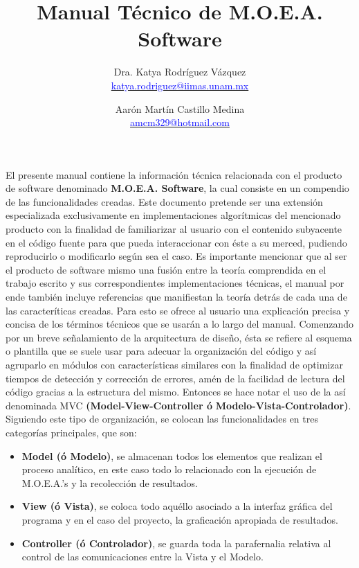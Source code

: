 \documentclass[12pt,twoside]{article}
\title{\vspace{+0.62cm}\textbf{Manual Técnico de M.O.E.A. Software}}
\author{Dra. Katya Rodríguez Vázquez \\ \href{mailto:katya.rodriguez@iimas.unam.mx}{\textcolor{blue}{katya.rodriguez@iimas.unam.mx}} 
   \and Aarón Martín Castillo Medina \\ \href{mailto:amcm329@hotmail.com}{\textcolor{blue}{amcm329@hotmail.com}}}
\date{}
\begin{document}
\maketitle

\vspace{-0.5cm}
El presente manual contiene la información técnica relacionada con el 
producto de software denominado \textbf{M.O.E.A. Software}, la cual consiste 
en un compendio de las funcionalidades creadas.\break
Este documento pretende ser una extensión especializada exclusivamente 
en implementaciones algorítmicas del mencionado producto con la finalidad 
de familiarizar al usuario con el contenido subyacente en el código fuente 
para que pueda interaccionar con éste a su merced, pudiendo reproducirlo o 
modificarlo según sea el caso.\medskip\break
Es importante mencionar que al ser el producto de software mismo una fusión 
entre la teoría comprendida en el trabajo escrito y sus correspondientes 
implementaciones técnicas, el manual por ende también incluye referencias 
que manifiestan la teoría detrás de cada una de las caracteríticas creadas.\break
Para esto se ofrece al usuario una explicación precisa y concisa de los términos
técnicos que se usarán a lo largo del manual.\medskip\break
Comenzando por un breve señalamiento de la arquitectura de diseño, ésta se refiere 
al esquema o plantilla que se suele usar para adecuar la organización del código 
y así agruparlo en módulos con características similares con la finalidad de 
optimizar tiempos de detección y corrección de errores, amén de la facilidad de 
lectura del código gracias a la estructura del mismo.\break
Entonces se hace notar el uso de la así denominada MVC \textbf{(Model-View-Controller 
ó }\break\textbf{Modelo-Vista-Controlador)}.\break
Siguiendo este tipo de organización, se colocan las funcionalidades en tres categorías 
principales, que son:

\begin{itemize}
\item \textbf{Model (ó Modelo)}, se almacenan todos los elementos que realizan 
el proceso analítico, en este caso todo lo relacionado con la ejecución de M.O.E.A.’s 
y la recolección de resultados.
\item \textbf{View (ó Vista)}, se coloca todo aquéllo asociado a la interfaz gráfica 
del programa y en el caso del proyecto, la graficación apropiada de resultados.
\item \textbf{Controller (ó Controlador)}, se guarda toda la parafernalia relativa 
al control de las comunicaciones entre la Vista y el Modelo.\medskip\break
\end{itemize}
\end{document}
